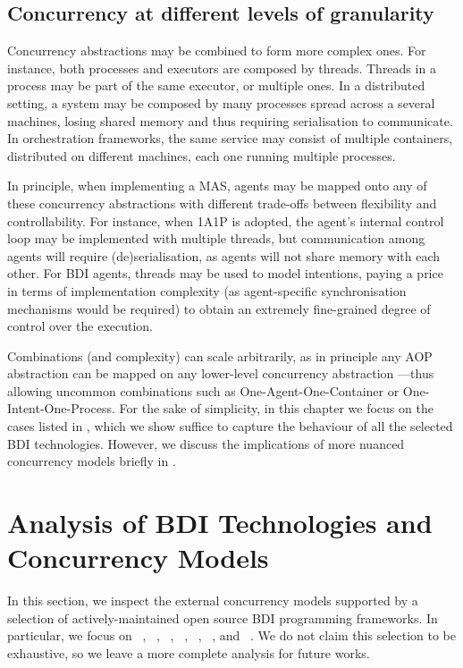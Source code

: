\subsection{Concurrency at different levels of granularity}
\label{sec:holoinc-perspective}

Concurrency abstractions may be combined to form more complex ones.
%
For instance, both processes and executors are composed by threads.
%
Threads in a process may be part of the same executor, or multiple ones.
%
In a distributed setting, a system may be composed by many processes spread across a several machines,
losing shared memory and thus requiring serialisation to communicate.
%
In orchestration frameworks,
the same service may consist of multiple containers,
distributed on different machines,
each one running multiple processes.

In principle,
when implementing a \ac{MAS}, agents may be mapped onto any of these concurrency abstractions
with different trade-offs between flexibility and controllability.
%
For instance, when \ac{1A1P} is adopted,
the agent's internal control loop may be implemented with multiple threads,
but communication among agents will require (de)serialisation,
as agents will not share memory with each other.
%
For \ac{BDI} agents,
threads may be used to model intentions,
paying a price in terms of implementation complexity
(as agent-specific synchronisation mechanisms would be required)
to obtain an extremely fine-grained degree of control over the execution.

Combinations (and complexity) can scale arbitrarily,
as in principle any \ac{AOP} abstraction can be mapped on any lower-level concurrency abstraction%
---thus allowing uncommon combinations such as One-Agent-One-Container or One-Intent-One-Process.
%
For the sake of simplicity,
in this chapter we focus on the cases listed in ,
which we show suffice to capture the behaviour of all the selected \ac{BDI} technologies.
However,
we discuss the implications of more nuanced concurrency models briefly in .

\section{Analysis of BDI Technologies and Concurrency Models}\label{sec:comparison}

In this section,
we inspect the external concurrency models supported by a selection of
actively-maintained open source \ac{BDI} programming frameworks.
%
In particular, we focus on
\astra~\cite{CollierRL15},
\goal{}~\cite{Hindriks2009},
\jadex~\cite{PokahrBL2005},
\jakta~\cite{BaiardiBCP23},
\jason~\cite{BordiniHW2007},
\phidias~\cite{DUrsoLS19},
and
\spadebdi~\cite{PalancaRCJT22}.
%
We do not claim this selection to be exhaustive, so we leave a more complete analysis for future works.

